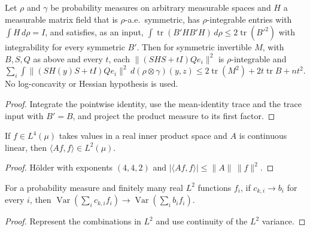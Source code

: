 \begin{lemma}
  \label{lem:spectral-noise-energy-integral}
  \leanok
  Let $\rho$ and $\gamma$ be probability measures on arbitrary measurable spaces and $H$ a measurable matrix field that is
  $\rho$-a.e.\ symmetric, has $\rho$-integrable entries with $\int H\,d\rho=I$, and satisfies, as an input,
  $\int\operatorname{tr}(B'HB'H)\,d\rho\le2\operatorname{tr}(B'^2)$ with integrability for every symmetric $B'$. Then for
  symmetric invertible $M$, with $B,S,Q$ as above and every $t$, each $\|(SHS+tI)Qe_i\|^2$ is $\rho$-integrable and
  $\sum_i\int\|(SH(y)S+tI)Qe_i\|^2\,d(\rho\otimes\gamma)(y,z)\le2\operatorname{tr}(M^2)+2t\operatorname{tr}B+nt^2$. No
  log-concavity or Hessian hypothesis is used.
\end{lemma}
\begin{proof}
  \leanok
  Integrate the pointwise identity, use the mean-identity trace and the trace input with $B'=B$, and project the product
  measure to its first factor.
\end{proof}

\begin{lemma}
  \label{lem:quadratic-form-fourth-moment}
  \leanok
  If $f\in L^4(\mu)$ takes values in a real inner product space and $A$ is continuous linear, then
  $\langle Af,f\rangle\in L^2(\mu)$.
\end{lemma}
\begin{proof}
  \leanok
  H\"older with exponents $(4,4,2)$ and $|\langle Af,f\rangle|\le\|A\|\,\|f\|^2$.
\end{proof}

\begin{lemma}
  \label{lem:finite-combination-variance-continuity}
  \leanok
  For a probability measure and finitely many real $L^2$ functions $f_i$, if $c_{k,i}\to b_i$ for every $i$, then
  $\operatorname{Var}(\sum_ic_{k,i}f_i)\to\operatorname{Var}(\sum_ib_if_i)$.
\end{lemma}
\begin{proof}
  \leanok
  Represent the combinations in $L^2$ and use continuity of the $L^2$ variance.
\end{proof}

